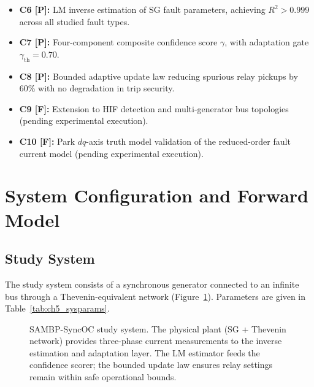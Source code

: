\begin{itemize}
\item \textbf{C6 [P]:} LM inverse estimation of SG fault parameters,
      achieving $R^2 > 0.999$ across all studied fault types.
\item \textbf{C7 [P]:} Four-component composite confidence score
      $\gamma$, with adaptation gate $\gamma_\mathrm{th} = 0.70$.
\item \textbf{C8 [P]:} Bounded adaptive update law reducing spurious
      relay pickups by 60\% with no degradation in trip security.
\item \textbf{C9 [F]:} Extension to HIF detection and multi-generator
      bus topologies (pending experimental execution).
\item \textbf{C10 [F]:} Park $dq$-axis truth model validation of the
      reduced-order fault current model (pending experimental execution).
\end{itemize}

\section{System Configuration and Forward Model}
\label{sec:ch5_system}

\subsection{Study System}

The study system consists of a synchronous generator connected to an
infinite bus through a Thevenin-equivalent network (Figure~\ref{fig:ch5_system}).
Parameters are given in Table~\ref{tab:ch5_sysparams}.

\begin{figure}[htbp]
  \centering
  
  \caption{SAMBP-SyncOC study system. The physical plant (SG + Thevenin
           network) provides three-phase current measurements to the
           inverse estimation and adaptation layer. The LM estimator feeds
           the confidence scorer; the bounded update law ensures relay
           settings remain within safe operational bounds.}
  \label{fig:ch5_system}
\end{figure}

